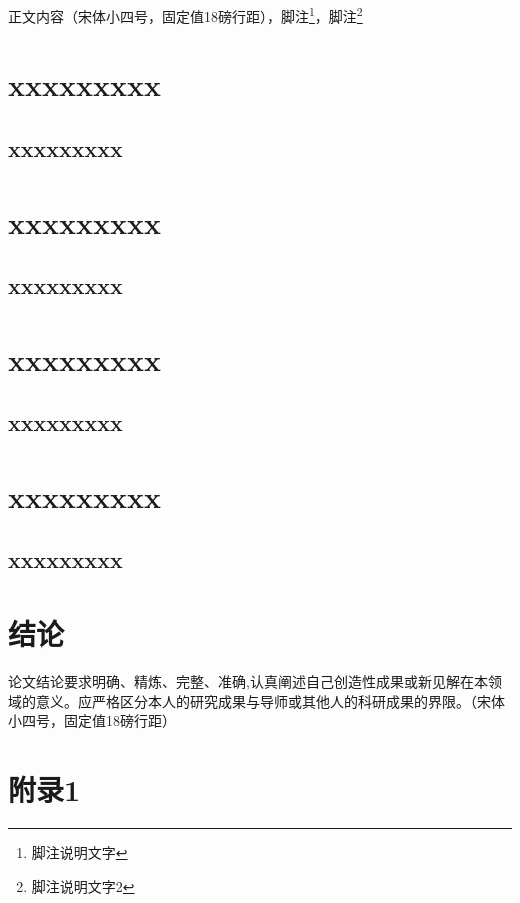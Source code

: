 \documentclass[master]{fnuthesis}
\begin{document}
正文内容（宋体小四号，固定值18磅行距），脚注\footnote{脚注说明文字}，脚注\footnote{脚注说明文字2}

\chapter{xxxxxxxxx}

\section{xxxxxxxxx}

\chapter{xxxxxxxxx}

\section{xxxxxxxxx}

\chapter{xxxxxxxxx}

\section{xxxxxxxxx}

\chapter{xxxxxxxxx}

\section{xxxxxxxxx}

\chapter{结论}

论文结论要求明确、精炼、完整、准确,认真阐述自己创造性成果或新见解在本领域的意义。应严格区分本人的研究成果与导师或其他人的科研成果的界限。（宋体小四号，固定值18磅行距）

\backmatter

\chapter{附录1}
\end{document}
